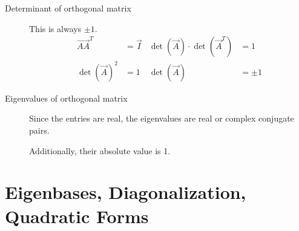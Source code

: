 \begin{description}
    \item[Determinant of orthogonal matrix] This is always $ \pm 1 $.
        \begin{align}
            \vec{AA}^T                          & = \vec{I} &
            \det(\vec{A}) \cdot \det(\vec{A}^T) & = 1         \\
            \det(\vec{A})^2                     & = 1       &
            \det(\vec{A})                       & = \pm 1
        \end{align}

    \item[Eigenvalues of orthogonal matrix] Since the entries are real, the eigenvalues
        are real or complex conjugate pairs. \par
        Additionally, their absolute value is 1.
\end{description}

\section{Eigenbases, Diagonalization, Quadratic Forms}

